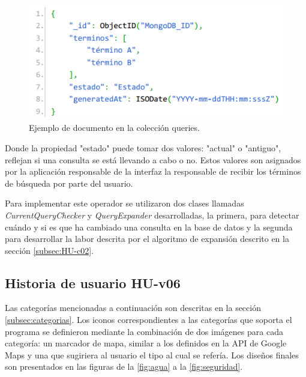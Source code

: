 \begin{figure}[H]
	\centering
	\captionsetup{justification=centering}
	\includegraphics[scale=0.8]{images/Query.png}
	\caption[Ejemplo de documento en la colección queries.]{Ejemplo de documento en la colección queries.}
	\label{fig:esquemaQuery}
\end{figure}

Donde la propiedad "estado" puede tomar dos valores: "actual" o "antiguo", reflejan si una consulta se está llevando a cabo o no. Estos valores son asignados por la aplicación responsable de la interfaz la responsable de recibir los términos de búsqueda por parte del usuario.

Para implementar este operador se utilizaron dos clases llamadas \textit{CurrentQueryChecker} y \textit{QueryExpander} desarrolladas, la primera, para detectar cuándo y si es que ha cambiado una consulta en la base de datos y la segunda para desarrollar la labor descrita por el algoritmo de expansión descrito en la sección \ref{subsec:HU-c02}.

\subsection{Historia de usuario HU-v06}
\label{subsec:HU-v06}

Las categorías mencionadas a continuación son descritas en la sección \ref{subsec:categorias}. Los iconos correspondientes a las categorías que soporta el programa se definieron mediante la combinación de dos imágenes para cada categoría: un marcador de mapa, similar a los definidos en la API de Google Maps y una que sugiriera al usuario el tipo al cual se refería. Los diseños finales son presentados en las figuras de la \ref{fig:agua} a la \ref{fig:seguridad}.\\

